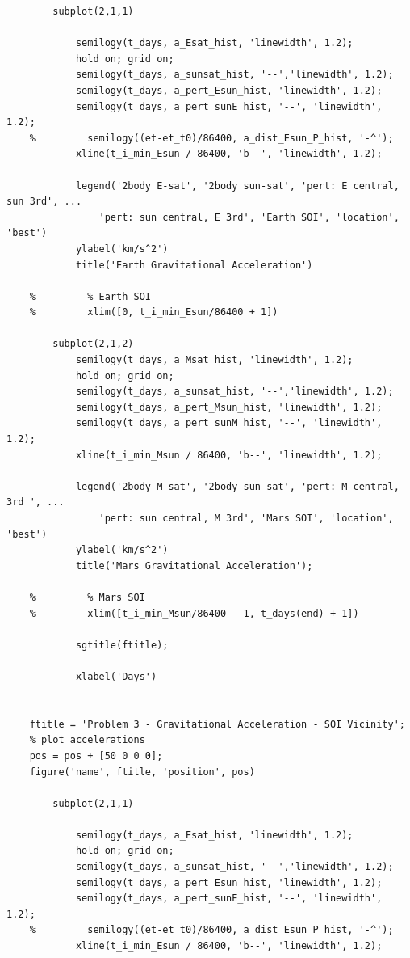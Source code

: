 \documentclass[conf]{new-aiaa}
\begin{document}
\begin{lstlisting}
        subplot(2,1,1) 
        
            semilogy(t_days, a_Esat_hist, 'linewidth', 1.2); 
            hold on; grid on; 
            semilogy(t_days, a_sunsat_hist, '--','linewidth', 1.2); 
            semilogy(t_days, a_pert_Esun_hist, 'linewidth', 1.2); 
            semilogy(t_days, a_pert_sunE_hist, '--', 'linewidth', 1.2); 
    %         semilogy((et-et_t0)/86400, a_dist_Esun_P_hist, '-^'); 
            xline(t_i_min_Esun / 86400, 'b--', 'linewidth', 1.2); 
            
            legend('2body E-sat', '2body sun-sat', 'pert: E central, sun 3rd', ... 
                'pert: sun central, E 3rd', 'Earth SOI', 'location', 'best')
            ylabel('km/s^2')
            title('Earth Gravitational Acceleration')
    
    %         % Earth SOI 
    %         xlim([0, t_i_min_Esun/86400 + 1])
            
        subplot(2,1,2) 
            semilogy(t_days, a_Msat_hist, 'linewidth', 1.2); 
            hold on; grid on; 
            semilogy(t_days, a_sunsat_hist, '--','linewidth', 1.2); 
            semilogy(t_days, a_pert_Msun_hist, 'linewidth', 1.2); 
            semilogy(t_days, a_pert_sunM_hist, '--', 'linewidth', 1.2); 
            xline(t_i_min_Msun / 86400, 'b--', 'linewidth', 1.2); 
            
            legend('2body M-sat', '2body sun-sat', 'pert: M central, 3rd ', ... 
                'pert: sun central, M 3rd', 'Mars SOI', 'location', 'best')
            ylabel('km/s^2')
            title('Mars Gravitational Acceleration'); 
            
    %         % Mars SOI 
    %         xlim([t_i_min_Msun/86400 - 1, t_days(end) + 1])
            
            sgtitle(ftitle); 
        
            xlabel('Days') 
            
    
    ftitle = 'Problem 3 - Gravitational Acceleration - SOI Vicinity'; 
    % plot accelerations 
    pos = pos + [50 0 0 0]; 
    figure('name', ftitle, 'position', pos)
    
        subplot(2,1,1) 
        
            semilogy(t_days, a_Esat_hist, 'linewidth', 1.2); 
            hold on; grid on; 
            semilogy(t_days, a_sunsat_hist, '--','linewidth', 1.2); 
            semilogy(t_days, a_pert_Esun_hist, 'linewidth', 1.2); 
            semilogy(t_days, a_pert_sunE_hist, '--', 'linewidth', 1.2); 
    %         semilogy((et-et_t0)/86400, a_dist_Esun_P_hist, '-^'); 
            xline(t_i_min_Esun / 86400, 'b--', 'linewidth', 1.2); 
            

\end{lstlisting}
\end{document}
